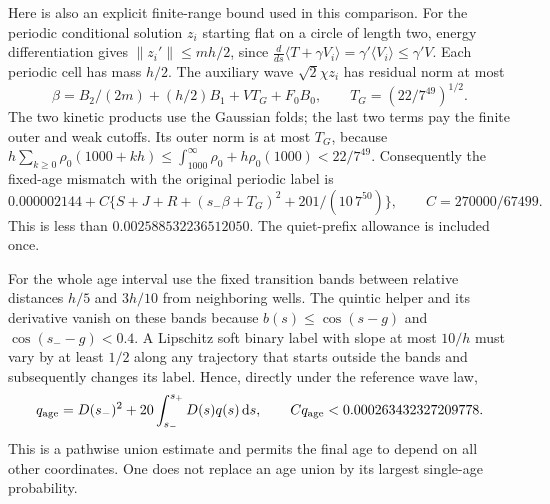 \documentclass[11pt]{article}
\theoremstyle{definition}\newtheorem{definition}[theorem]{Definition}
\theoremstyle{remark}\newtheorem{remark}[theorem]{Remark}
\newcommand{\dd}{\,\mathrm d}\newcommand{\Imv}{\operatorname{Im}}\newcommand{\ii}{\mathrm i}
\begin{document}
Here is also an explicit finite-range bound used in this comparison.
For the periodic conditional solution $z_i$ starting flat on a circle
of length two, energy differentiation gives
$\|z_i'\|\leq mh/2$, since
$\frac d{ds}\langle T+\gamma V_i\rangle=\gamma'\langle V_i\rangle
\leq\gamma'V$. Each periodic cell has mass $h/2$.
The auxiliary wave $\sqrt2\chi z_i$ has residual norm at most
\begin{equation}
 \beta=B_2/(2m)+(h/2)B_1+VT_G+F_0B_0,
 \qquad T_G=(22/7^{49})^{1/2}.
 \label{old:outerbeta}
\end{equation}
The two kinetic products use the Gaussian folds; the last two terms
pay the finite outer and weak cutoffs. Its outer norm is at most $T_G$,
because $h\sum_{k\geq0}\rho_0(1000+kh)\leq
\int_{1000}^\infty\rho_0+h\rho_0(1000)<22/7^{49}$.
Consequently the fixed-age mismatch with the original periodic label is
\begin{equation}
 0.000002144+C\{S+J+R+(s_-\beta+T_G)^2+201/(10\,7^{50})\},
 \qquad C=270000/67499.
 \label{old:endpointexpression}
\end{equation}
This is less than $0.002588532236512050$. The quiet-prefix allowance
is included once.

For the whole age interval use the fixed transition bands between
relative distances $h/5$ and $3h/10$ from neighboring wells.
The quintic helper and its derivative vanish on these bands because
$b(s)\leq\cos(s-g)$ and $\cos(s_--g)<0.4$.
A Lipschitz soft binary label with slope at most $10/h$ must vary by
at least $1/2$ along any trajectory that starts outside the bands and
subsequently changes its label. Hence, directly under the reference
wave law,
\begin{equation}
 q_{\rm age}=D(s_-)^2+20\int_{s_-}^{s_+}D(s)q(s)\dd s,
 \qquad Cq_{\rm age}<0.000263432327209778.
 \label{old:ageunion}
\end{equation}
This is a pathwise union estimate and permits the final age to depend on
all other coordinates. One does not replace an age union by its largest
single-age probability.
\end{document}
